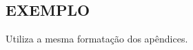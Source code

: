 


\begin{anexosenv}

  \chapter[Exemplo]{EXEMPLO} \label{anex:a}
  Utiliza a mesma formatação dos apêndices.
\end{anexosenv}